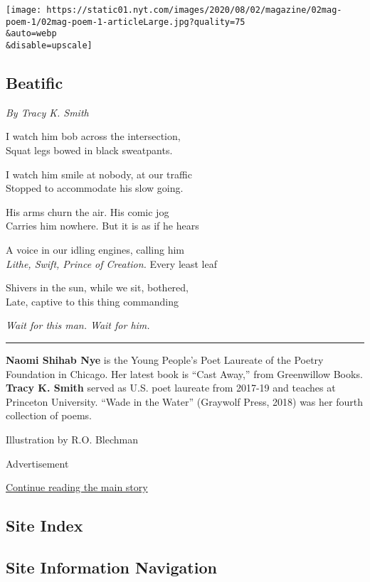 \texttt{[image: https://static01.nyt.com/images/2020/08/02/magazine/02mag-poem-1/02mag-poem-1-articleLarge.jpg?quality=75\\\&auto=webp\\\&disable=upscale]}

\hypertarget{beatific}{%
\subsection{Beatific}\label{beatific}}

\emph{By Tracy K. Smith}

I watch him bob across the intersection,\\
Squat legs bowed in black sweatpants.

I watch him smile at nobody, at our traffic\\
Stopped to accommodate his slow going.

His arms churn the air. His comic jog\\
Carries him nowhere. But it is as if he hears

A voice in our idling engines, calling him\\
\emph{Lithe, Swift, Prince of Creation.} Every least leaf

Shivers in the sun, while we sit, bothered,\\
Late, captive to this thing commanding

\emph{Wait for this man. Wait for him.}

\begin{center}\rule{0.5\linewidth}{\linethickness}\end{center}

\textbf{Naomi Shihab Nye} is the Young People's Poet Laureate of the
Poetry Foundation in Chicago. Her latest book is ``Cast Away,'' from
Greenwillow Books. \textbf{Tracy K. Smith} served as U.S. poet laureate
from 2017-19 and teaches at Princeton University. ``Wade in the Water''
(Graywolf Press, 2018) was her fourth collection of poems.

Illustration by R.O. Blechman

Advertisement

\protect\hyperlink{after-bottom}{Continue reading the main story}

\hypertarget{site-index}{%
\subsection{Site Index}\label{site-index}}

\hypertarget{site-information-navigation}{%
\subsection{Site Information
Navigation}\label{site-information-navigation}}

